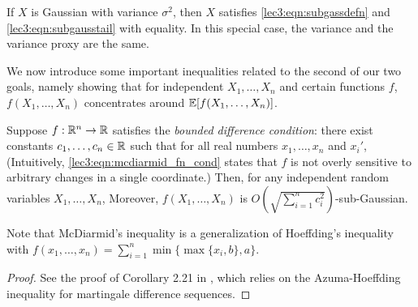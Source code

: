 \begin{example}
If $X$ is Gaussian with variance $\sigma^2$, then $X$ satisfies \eqref{lec3:eqn:subgassdefn} and \eqref{lec3:eqn:subgausstail} with equality. In this special case, the variance and the variance proxy are the same.
\end{example}

We now introduce some important inequalities related to the second of our two goals, namely showing that for independent $X_1, \dotsc, X_n$ and certain functions $f$, $f(X_1, \dotsc, X_n)$ concentrates around $\operatorname*{\mathbb{E}}[f(X_1, \dotsc, X_n)]$.

\begin{theorem}
    Suppose $f : \mathbb R^n \to \mathbb R$ satisfies the \emph{bounded difference condition}: there exist constants $c_1, \ldots, c_n \in \mathbb R$ such that for all real numbers $x_1, \ldots, x_n$ and $x_i'$,
    (Intuitively, \eqref{lec3:eqn:mcdiarmid_fn_cond} states that $f$ is not overly sensitive to arbitrary changes in a single coordinate.) Then, for any independent random variables $X_1, \ldots, X_n$,
    Moreover, $f(X_1, \ldots, X_n)$ is $O\left(\sqrt{\sum_{i = 1}^n c_i^2}\right)$-sub-Gaussian.
\end{theorem}

\begin{remark}
    Note that McDiarmid's inequality is a generalization of Hoeffding's inequality with $f(x_1, \dotsc, x_n) = \sum_{i = 1}^n \min\{\max\{x_i, b\}, a\}$.
\end{remark}

\begin{proof}
    See the proof of Corollary 2.21 in \cite{wainwright2019high}, which relies on the Azuma-Hoeffding inequality for martingale difference sequences.
\end{proof}

